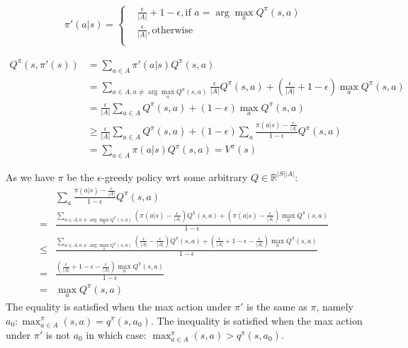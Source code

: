 \documentclass[11pt]{article}
\theoremstyle{case}
\begin{document}
\begin{shaded}

\begin{align*}
\pi'(a|s) = 
	\begin{cases}
	& \frac{\epsilon}{|A|} + 1 -\epsilon, \text {if }a = \arg \max_a Q^\pi(s,a)\\
	& \frac{\epsilon}{|A|}, \text {otherwise} \\
	\end{cases}
\end{align*}

\begin{align*}
   Q^{\pi}(s,\pi'(s)) & = \sum_{a \in A} \pi'(a|s) Q^{\pi}(s,a) \\
					& = \sum_{a \in A, a \neq \arg \max_a Q^\pi(s,a)}  \frac{\epsilon}{|A|} Q^{\pi}(s,a) + (\frac{\epsilon}{|A|}+1- \epsilon) \max_a  Q^\pi(s,a)\\
					& = \frac{\epsilon}{|A|} \sum_{a \in A}  Q^{\pi}(s,a) + (1- \epsilon) \max_a Q^\pi(s,a) \\	
					& \geq \frac{\epsilon}{|A|} \sum_{a \in A} Q^{\pi}(s,a) + (1- \epsilon)  \sum_a \frac{\pi(a|s)-\frac{\epsilon}{|A|}}{1-\epsilon} Q^\pi(s,a) \\
					& =  \sum_{a \in A} \pi(a|s) Q^{\pi}(s,a)  = V^{\pi}(s)
\end{align*}

As we have $\pi$ be the $\epsilon$-greedy policy wrt some arbitrary $Q\in\mathbb{R}^{|S||A|}$:
\begin{align*}
   &\sum_a \frac{\pi(a|s)-\frac{\epsilon}{|A|}}{1-\epsilon} Q^\pi(s,a)\\
= &  \frac{ \sum_{a \in A, a \neq \arg \max_a Q^\pi(s,a) } (\pi(a|s)-\frac{\epsilon}{|A|}) Q^\pi(s,a) + (\pi(a|s)-\frac{\epsilon}{|A|}) \max_a Q^\pi(s,a)}{1-\epsilon} \\
\leq &  \frac{ \sum_{a \in A, a \neq \arg \max_a Q^\pi(s,a) } (\frac{\epsilon}{|A|}-\frac{\epsilon}{|A|}) Q^\pi(s,a) + (\frac{\epsilon}{|A|} + 1 -\epsilon-\frac{\epsilon}{|A|}) \max_a Q^\pi(s,a)}{1-\epsilon} \\
= &  \frac{ (\frac{\epsilon}{|A|} + 1 -\epsilon-\frac{\epsilon}{|A|}) \max_a Q^\pi(s,a)}{1-\epsilon} \\
=  & \max_a Q^\pi(s,a)
\end{align*}
The equality is satisfied when the max action under $\pi'$ is the same as $\pi$, namely $a_0: \max_{a\in A} ^\pi(s,a)=q^\pi(s,a_0)$. The inequality is satisfied when the max action under $\pi'$ is not $a_0$ in which case: $\max_{a\in A} ^\pi(s,a) > q^\pi(s,a_0)$.

\end{shaded}
\end{document}
